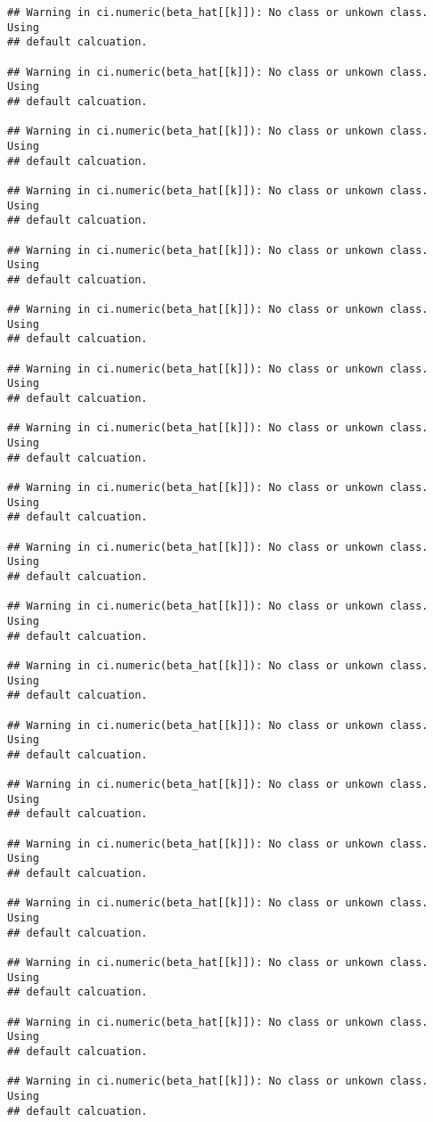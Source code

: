 \documentclass[]{article}
\begin{document}
\begin{verbatim}
## Warning in ci.numeric(beta_hat[[k]]): No class or unkown class. Using
## default calcuation.

## Warning in ci.numeric(beta_hat[[k]]): No class or unkown class. Using
## default calcuation.

## Warning in ci.numeric(beta_hat[[k]]): No class or unkown class. Using
## default calcuation.

## Warning in ci.numeric(beta_hat[[k]]): No class or unkown class. Using
## default calcuation.

## Warning in ci.numeric(beta_hat[[k]]): No class or unkown class. Using
## default calcuation.

## Warning in ci.numeric(beta_hat[[k]]): No class or unkown class. Using
## default calcuation.

## Warning in ci.numeric(beta_hat[[k]]): No class or unkown class. Using
## default calcuation.

## Warning in ci.numeric(beta_hat[[k]]): No class or unkown class. Using
## default calcuation.

## Warning in ci.numeric(beta_hat[[k]]): No class or unkown class. Using
## default calcuation.

## Warning in ci.numeric(beta_hat[[k]]): No class or unkown class. Using
## default calcuation.

## Warning in ci.numeric(beta_hat[[k]]): No class or unkown class. Using
## default calcuation.

## Warning in ci.numeric(beta_hat[[k]]): No class or unkown class. Using
## default calcuation.

## Warning in ci.numeric(beta_hat[[k]]): No class or unkown class. Using
## default calcuation.

## Warning in ci.numeric(beta_hat[[k]]): No class or unkown class. Using
## default calcuation.

## Warning in ci.numeric(beta_hat[[k]]): No class or unkown class. Using
## default calcuation.

## Warning in ci.numeric(beta_hat[[k]]): No class or unkown class. Using
## default calcuation.

## Warning in ci.numeric(beta_hat[[k]]): No class or unkown class. Using
## default calcuation.

## Warning in ci.numeric(beta_hat[[k]]): No class or unkown class. Using
## default calcuation.

## Warning in ci.numeric(beta_hat[[k]]): No class or unkown class. Using
## default calcuation.


\end{verbatim}
\end{document}
